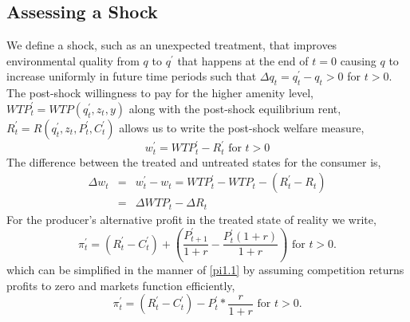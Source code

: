 \documentclass[ecta,nameyear,draft]{econsocart}
\theoremstyle{plain}
\theoremstyle{remark}
\begin{document}
\subsection{Assessing a Shock}
We define a shock, such as an unexpected treatment, that improves environmental quality from $q$ to $q^\prime$ that happens at the end of $t=0$ causing $q$ to increase uniformly in future time periods such that $\Delta q_t=q^\prime_t-q_t>0$ for $t>0$.
The post-shock willingness to pay for the higher amenity level,$\mathit{WTP}^\prime_t=\mathit{WTP}(q^\prime_t,z_t,y)$ along with the post-shock equilibrium rent, $R^\prime_t=R(q^\prime_t,z_t,P^\prime_t,C^\prime_t)$ allows us to write the post-shock welfare measure,
\begin{equation*}
	w^\prime_t=\mathit{WTP}^\prime_t-R^\prime_t \text{ for } t>0
\end{equation*}
The difference between the treated and untreated states for the consumer is,
\begin{eqnarray*}
	\Delta w_t&=&w^\prime_t-w_t=\mathit{WTP}^\prime_t-\mathit{WTP}_t-(R^\prime_t-R_t)\\
	&=&\Delta\mathit{WTP}_t-\Delta R_t
\end{eqnarray*}
For the producer’s alternative profit in the treated state of reality we write,
\begin{equation*}
	\pi^\prime_t = (R^\prime_t-C^\prime_t)+\left(\frac{P^\prime_{t+1}}{1+r}-\frac{P^\prime_t(1+r)}{1+r}\right)\text{ for } t>0.
\end{equation*}
which can be simplified in the manner of \ref{pi1.1} by assuming competition returns profits to zero and markets function efficiently,
\begin{equation*}
\pi^\prime_t = (R^\prime_t-C^\prime_t)-P^\prime_t*\frac{r}{1+r}\text{ for } t>0.\label{pi2}
\end{equation*}
\end{document}
